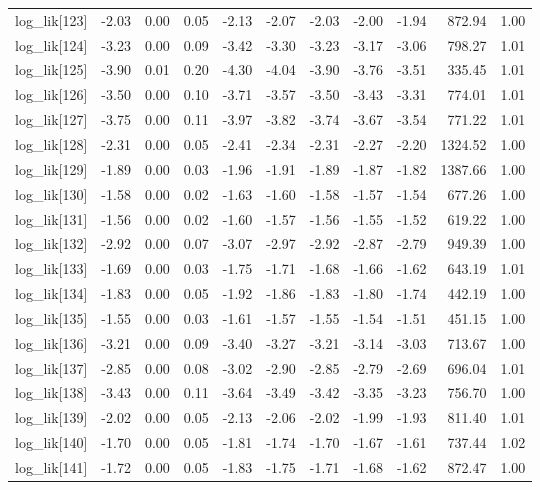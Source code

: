 \begin{table}[ht]
\begin{tabular}{rrrrrrrrrrr}
  log\_lik[123] & -2.03 & 0.00 & 0.05 & -2.13 & -2.07 & -2.03 & -2.00 & -1.94 & 872.94 & 1.00 \\ 
  log\_lik[124] & -3.23 & 0.00 & 0.09 & -3.42 & -3.30 & -3.23 & -3.17 & -3.06 & 798.27 & 1.01 \\ 
  log\_lik[125] & -3.90 & 0.01 & 0.20 & -4.30 & -4.04 & -3.90 & -3.76 & -3.51 & 335.45 & 1.01 \\ 
  log\_lik[126] & -3.50 & 0.00 & 0.10 & -3.71 & -3.57 & -3.50 & -3.43 & -3.31 & 774.01 & 1.01 \\ 
  log\_lik[127] & -3.75 & 0.00 & 0.11 & -3.97 & -3.82 & -3.74 & -3.67 & -3.54 & 771.22 & 1.01 \\ 
  log\_lik[128] & -2.31 & 0.00 & 0.05 & -2.41 & -2.34 & -2.31 & -2.27 & -2.20 & 1324.52 & 1.00 \\ 
  log\_lik[129] & -1.89 & 0.00 & 0.03 & -1.96 & -1.91 & -1.89 & -1.87 & -1.82 & 1387.66 & 1.00 \\ 
  log\_lik[130] & -1.58 & 0.00 & 0.02 & -1.63 & -1.60 & -1.58 & -1.57 & -1.54 & 677.26 & 1.00 \\ 
  log\_lik[131] & -1.56 & 0.00 & 0.02 & -1.60 & -1.57 & -1.56 & -1.55 & -1.52 & 619.22 & 1.00 \\ 
  log\_lik[132] & -2.92 & 0.00 & 0.07 & -3.07 & -2.97 & -2.92 & -2.87 & -2.79 & 949.39 & 1.00 \\ 
  log\_lik[133] & -1.69 & 0.00 & 0.03 & -1.75 & -1.71 & -1.68 & -1.66 & -1.62 & 643.19 & 1.01 \\ 
  log\_lik[134] & -1.83 & 0.00 & 0.05 & -1.92 & -1.86 & -1.83 & -1.80 & -1.74 & 442.19 & 1.00 \\ 
  log\_lik[135] & -1.55 & 0.00 & 0.03 & -1.61 & -1.57 & -1.55 & -1.54 & -1.51 & 451.15 & 1.00 \\ 
  log\_lik[136] & -3.21 & 0.00 & 0.09 & -3.40 & -3.27 & -3.21 & -3.14 & -3.03 & 713.67 & 1.00 \\ 
  log\_lik[137] & -2.85 & 0.00 & 0.08 & -3.02 & -2.90 & -2.85 & -2.79 & -2.69 & 696.04 & 1.01 \\ 
  log\_lik[138] & -3.43 & 0.00 & 0.11 & -3.64 & -3.49 & -3.42 & -3.35 & -3.23 & 756.70 & 1.00 \\ 
  log\_lik[139] & -2.02 & 0.00 & 0.05 & -2.13 & -2.06 & -2.02 & -1.99 & -1.93 & 811.40 & 1.01 \\ 
  log\_lik[140] & -1.70 & 0.00 & 0.05 & -1.81 & -1.74 & -1.70 & -1.67 & -1.61 & 737.44 & 1.02 \\ 
  log\_lik[141] & -1.72 & 0.00 & 0.05 & -1.83 & -1.75 & -1.71 & -1.68 & -1.62 & 872.47 & 1.00 \\ 

\end{tabular}
\end{table}
